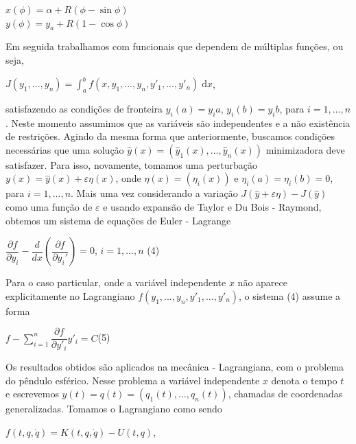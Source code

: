 \documentclass[12pt, a4paper]{article}
\begin{document}
\begin{center}
$x(\phi)= \alpha + R(\phi - \sin \phi) $\\
$y(\phi)= y_a  + R(1 - \cos \phi)$

\end{center}

Em seguida trabalhamos com funcionais que dependem de múltiplas funções, ou seja,

\begin{center}
$J(y_1, ... , y_n) = \int_a^b f(x,y_1, ... , y_n, y'_1, ... , y'_n) \; \mathrm{d}x$,
\end{center}

satisfazendo as condições de fronteira $y_i (a) = y_ia$, $y_i (b) = y_ib$, para $i=1,…,n$. Neste momento assumimos que as variáveis são independentes e a não existência de restrições. Agindo da mesma forma que anteriormente, buscamos condições necessárias que uma solução $\hat{y}(x)=(\hat{y}_1(x),...,\hat{y}_n(x))$ minimizadora deve satisfazer. Para isso, novamente, tomamos uma perturbação $y(x)= \hat{y}(x) + \varepsilon \eta(x)$, onde $\eta(x)=(\eta_i (x))$   e  $\eta_i (a)=\eta_i (b)  = 0$,
para $i =1,...,n$. Mais uma vez considerando a variação $J(\hat{y} + \varepsilon\eta) - J(\hat{y})$ como uma função de $\varepsilon$ e usando expansão de Taylor e Du Bois - Raymond, obtemos um sistema de equações de Euler - Lagrange

\begin{center}
$\dfrac{\partial f}{\partial y_i} - \dfrac{d}{dx}(\dfrac{\partial f}{\partial y_i'}) = 0 $, $ i = 1,...,n$ (4)
\end{center}

Para o caso particular, onde a variável independente $x$ não aparece explicitamente no Lagrangiano $f(y_1,...,y_n,y'_1,...,y'_n)$, o sistema (4) assume a forma

\begin{center}
$f - \sum_{i=1}^{n} \dfrac{\partial f}{\partial y'_i} y'_i = C$(5)
\end{center}

Os resultados obtidos são aplicados na mecânica - Lagrangiana, com o problema do pêndulo esférico. Nesse problema a variável independente $x$ denota o tempo $t$ e escrevemos $y(t)=q(t)=(q_1 (t),…,q_n (t))$, chamadas de coordenadas generalizadas. Tomamos o Lagrangiano como sendo

\begin{center}
$ f(t, q, \dot q) = K(t, q, \dot q) - U(t, q) $,
\end{center}
\end{document}
